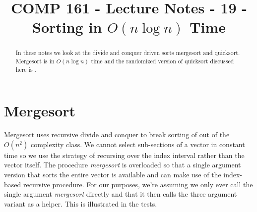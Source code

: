 \documentclass[]{tufte-handout}
\title{COMP 161 - Lecture Notes - 19 - Sorting in $O(n\log n)$ Time}
\begin{document}
 
\maketitle

\begin{abstract}
In these notes we look at the divide and conquer driven sorts mergesort and quicksort. Mergesort is in $O(n\log n)$ time and the randomized version of quicksort discussed here is .
\end{abstract}

\section{Mergesort}

Mergesort uses recursive divide and conquer to break sorting of out of the $O(n^2)$ complexity class. We cannot select sub-sections of a vector in constant time so we use the strategy of recursing over the index interval rather than the vector itself.  The procedure \textit{mergesort} is overloaded so that a single argument version that sorts the entire vector is available and can make use of the index-based recursive procedure. For our purposes, we're assuming we only ever call the single argument \textit{mergesort} directly and that it then calls the three argument variant as a helper. This is illustrated in the tests.
\end{document}
